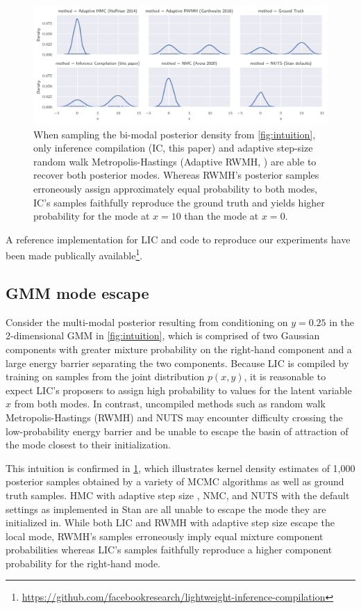 \documentclass[../../thesis.tex]{subfiles}
\begin{document}
\begin{figure}
  \includegraphics[width=\linewidth]{Figures/mode_escape.pdf}
  \caption{
    When sampling the bi-modal posterior density from \cref{fig:intuition},
    only inference compilation (IC, this paper) and adaptive step-size random walk
    Metropolis-Hastings (Adaptive RWMH, \cite{garthwaite2016adaptive}) are
    able to recover both posterior modes. Whereas RWMH's posterior samples
    erroneously assign approximately equal probability to both modes,
    IC's samples faithfully reproduce the ground truth and yields
    higher probability for the mode at $x=10$ than the mode at $x=0$.
  }\label{fig:gmm_mode_escape}
\end{figure}

A reference implementation for LIC and code to reproduce our experiments
have been made publically available\footnote{\url{https://github.com/facebookresearch/lightweight-inference-compilation}}.

\subsection{GMM mode escape}
\label{ssec:gmm}

Consider the multi-modal posterior resulting from conditioning on $y=0.25$ in
the 2-dimensional GMM in \cref{fig:intuition}, which is comprised of two
Gaussian components with greater mixture probability on the right-hand
component and a large energy barrier separating the two components. Because
LIC is compiled by training on samples from the joint distribution $p(x, y)$,
it is reasonable to expect LIC's proposers to assign high probability to
values for the latent variable $x$ from both modes. In contrast, uncompiled
methods such as random walk Metropolis-Hastings (RWMH) and NUTS may encounter
difficulty crossing the low-probability energy barrier and be unable to escape
the basin of attraction of the mode closest to their initialization.

This intuition is confirmed in \cref{fig:gmm_mode_escape}, which illustrates
kernel density estimates of 1,000 posterior samples obtained by a variety of
MCMC algorithms as well as ground truth samples. HMC with adaptive step size
\citep{hoffman2014no}, NMC, and NUTS with the default settings as implemented
in Stan \citep{carpenter2017stan} are all unable to escape the mode they are
initialized in. While both LIC and RWMH with adaptive step size escape the
local mode, RWMH's samples erroneously imply equal mixture component
probabilities whereas LIC's samples faithfully reproduce a higher component
probability for the right-hand mode.
\end{document}
